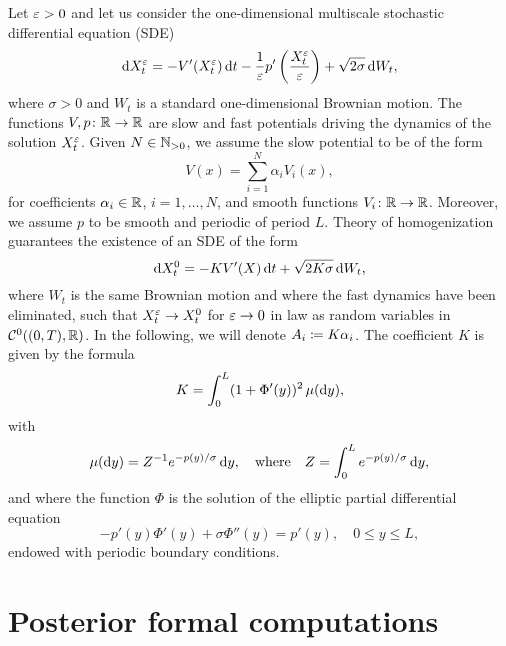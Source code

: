 \documentclass[10pt]{article}
\begin{document}
Let $\varepsilon > 0$ and let us consider the one-dimensional multiscale stochastic differential equation (SDE)
\begin{equation}\label{eq:SDE_MS}
	\mathrm{d} X_t^\varepsilon = -V'(X_t^\varepsilon) \,\mathrm{d} t - \frac1{\varepsilon} p'\left(\frac{X_t^\varepsilon}{\varepsilon}\right) + \sqrt{2\sigma} \,\mathrm{d} W_t,
\end{equation}
where $\sigma > 0$ and $W_t$ is a standard one-dimensional Brownian motion. The functions $V, p\colon \mathbb{R} \to \mathbb{R}$ are slow and fast potentials driving the dynamics of the solution $X_t^\varepsilon$. Given $N \in \mathbb{N}_{>0}$, we assume the slow potential to be of the form
\begin{equation}
	V(x) = \sum_{i=1}^N \alpha_i V_i(x),
\end{equation}
for coefficients $\alpha_i \in \mathbb{R}$, $i = 1, \ldots, N$, and smooth functions $V_i\colon \mathbb{R} \to \mathbb{R}$. Moreover, we assume $p$ to be smooth and periodic of period $L$. Theory of homogenization \cite{BLP78} guarantees the existence of an SDE of the form
\begin{equation}\label{eq:SDE_HOM}
	\mathrm{d} X_t^0 = - K V'(X) \,\mathrm{d} t + \sqrt{2K\sigma} \,\mathrm{d} W_t,
\end{equation}
where $W_t$ is the same Brownian motion and where the fast dynamics have been eliminated, such that $X_t^\varepsilon \to X_t^0$ for $\varepsilon\to 0$ in law as random variables in $\mathcal C^0((0, T), \mathbb{R})$. In the following, we will denote $A_i \coloneqq K\alpha_i$. The coefficient $K$ is given by the formula
\begin{equation}\label{eq:K_HOM}
	K = \int_0^L (1 + \Phi'(y))^2 \, \mu(\mathrm{d} y),
\end{equation}
with 
\begin{equation}
	\mu(\mathrm{d} y) = Z^{-1} e^{-p(y)/\sigma} \,\mathrm{d} y, \quad\text{where}\quad Z = \int_0^L e^{-p(y)/\sigma} \,\mathrm{d} y,
\end{equation}
and where the function $\Phi$ is the solution of the elliptic partial differential equation
\begin{equation}
	-p'(y)\Phi'(y) + \sigma \Phi''(y) = p'(y), \quad 0 \leq y \leq L,
\end{equation}
endowed with periodic boundary conditions.

\section{Posterior formal computations}
\end{document}
